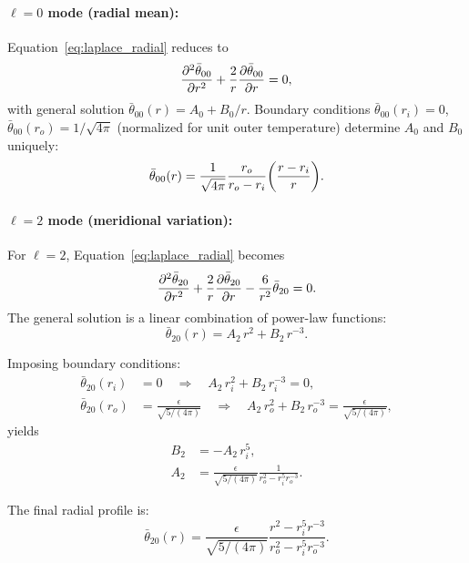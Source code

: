 \documentclass[11pt]{article}
\numberwithin{equation}{section}
\begin{document}
\paragraph{$\ell=0$ mode (radial mean):}
Equation~\eqref{eq:laplace_radial} reduces to
\[
  \pdv[2]{\bar{\theta}_{00}}{r} + \frac{2}{r} \pdv{\bar{\theta}_{00}}{r} = 0,
\]
with general solution $\bar{\theta}_{00}(r) = A_0 + B_0/r$. Boundary conditions $\bar{\theta}_{00}(r_i) = 0$, $\bar{\theta}_{00}(r_o) = 1/\sqrt{4\pi}$ (normalized for unit outer temperature) determine $A_0$ and $B_0$ uniquely:
\begin{equation}
  \bar{\theta}_{00}(r) = \frac{1}{\sqrt{4\pi}} \frac{r_o}{r_o - r_i} \qty( \frac{r - r_i}{r} ).
  \label{eq:theta_00}
\end{equation}

\paragraph{$\ell=2$ mode (meridional variation):}
For $\ell=2$, Equation~\eqref{eq:laplace_radial} becomes
\begin{equation}
  \pdv[2]{\bar{\theta}_{20}}{r} + \frac{2}{r} \pdv{\bar{\theta}_{20}}{r} - \frac{6}{r^2} \bar{\theta}_{20} = 0.
  \label{eq:laplace_l2}
\end{equation}
The general solution is a linear combination of power-law functions:
\begin{equation}
  \bar{\theta}_{20}(r) = A_2 \, r^2 + B_2 \, r^{-3}.
  \label{eq:theta_20_general}
\end{equation}

Imposing boundary conditions:
\begin{align}
  \bar{\theta}_{20}(r_i) &= 0 \quad \Rightarrow \quad A_2 \, r_i^2 + B_2 \, r_i^{-3} = 0, \label{eq:bc_l2_inner} \\
  \bar{\theta}_{20}(r_o) &= \frac{\epsilon}{\sqrt{5/(4\pi)}} \quad \Rightarrow \quad A_2 \, r_o^2 + B_2 \, r_o^{-3} = \frac{\epsilon}{\sqrt{5/(4\pi)}}, \label{eq:bc_l2_outer}
\end{align}
yields
\begin{align}
  B_2 &= -A_2 \, r_i^5, \\
  A_2 &= \frac{\epsilon}{\sqrt{5/(4\pi)}} \frac{1}{r_o^2 - r_i^5 r_o^{-3}}.
\end{align}

The final radial profile is:
\begin{equation}
  \bar{\theta}_{20}(r) = \frac{\epsilon}{\sqrt{5/(4\pi)}} \frac{r^2 - r_i^5 r^{-3}}{r_o^2 - r_i^5 r_o^{-3}}.
  \label{eq:theta_20_solution}
\end{equation}
\end{document}
